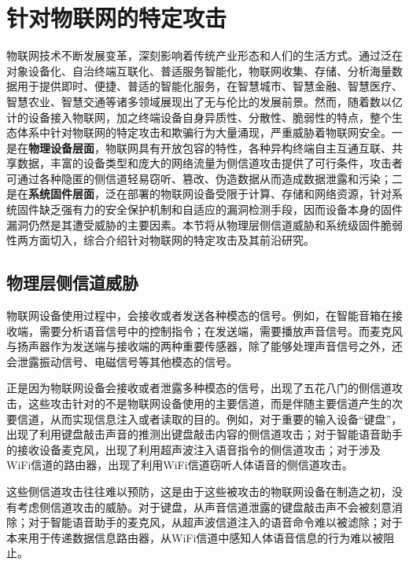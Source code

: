 \section{针对物联网的特定攻击}
\label{specific-attack}

物联网技术不断发展变革，深刻影响着传统产业形态和人们的生活方式。通过泛在对象设备化、自治终端互联化、普适服务智能化，物联网收集、存储、分析海量数据用于提供即时、便捷、普适的智能化服务，在智慧城市、智慧金融、智慧医疗、智慧农业、智慧交通等诸多领域展现出了无与伦比的发展前景。然而，随着数以亿计的设备接入物联网，加之终端设备自身异质性、分散性、脆弱性的特点，整个生态体系中针对物联网的特定攻击和欺骗行为大量涌现，严重威胁着物联网安全。一是在\textcolor{myblue}{\textbf{物理设备层面}}，物联网具有开放包容的特性，各种异构终端自主互通互联、共享数据，丰富的设备类型和庞大的网络流量为侧信道攻击提供了可行条件，攻击者可通过各种隐匿的侧信道轻易窃听、篡改、伪造数据从而造成数据泄露和污染；二是在\textcolor{myblue}{\textbf{系统固件层面}}，泛在部署的物联网设备受限于计算、存储和网络资源，针对系统固件缺乏强有力的安全保护机制和自适应的漏洞检测手段，因而设备本身的固件漏洞仍然是其遭受威胁的主要因素。本节将从物理层侧信道威胁和系统级固件脆弱性两方面切入，综合介绍针对物联网的特定攻击及其前沿研究。


\subsection{物理层侧信道威胁}
\label{side-channel}

物联网设备使用过程中，会接收或者发送各种模态的信号。例如，在智能音箱在接收端，需要分析语音信号中的控制指令；在发送端，需要播放声音信号。而麦克风与扬声器作为发送端与接收端的两种重要传感器，除了能够处理声音信号之外，还会泄露振动信号、电磁信号等其他模态的信号。

正是因为物联网设备会接收或者泄露多种模态的信号，出现了五花八门的侧信道攻击，这些攻击针对的不是物联网设备使用的主要信道，而是伴随主要信道产生的次要信道，从而实现信息注入或者读取的目的。例如，对于重要的输入设备“键盘”，出现了利用键盘敲击声音的推测出键盘敲击内容的侧信道攻击；对于智能语音助手的接收设备麦克风，出现了利用超声波注入语音指令的侧信道攻击；对于涉及WiFi信道的路由器，出现了利用WiFi信道窃听人体语音的侧信道攻击。

这些侧信道攻击往往难以预防，这是由于这些被攻击的物联网设备在制造之初，没有考虑侧信道攻击的威胁。对于键盘，从声音信道泄露的键盘敲击声不会被刻意消除；对于智能语音助手的麦克风，从超声波信道注入的语音命令难以被滤除；对于本来用于传递数据信息路由器，从WiFi信道中感知人体语音信息的行为难以被阻止。



